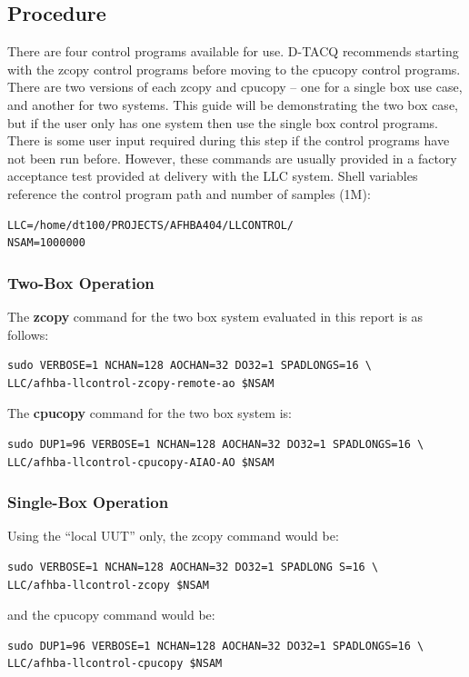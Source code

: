 \documentclass{article}
\begin{document}
\subsection{Procedure}
There are four control programs available for use.
\mbox{D-TACQ} recommends starting with the zcopy control programs before moving to the cpucopy control programs.
There are two versions of each zcopy and cpucopy – one for a single box use case, and another for two systems.
This guide will be demonstrating the two box case, but if the user only has one system then use the single box control programs.
There is some user input required during this step if the control programs have not been run before.
However, these commands are usually provided in a factory acceptance test provided at delivery with the LLC system.
Shell variables reference the control program path and number of samples (1M):
\begin{verbatim}
LLC=/home/dt100/PROJECTS/AFHBA404/LLCONTROL/
NSAM=1000000
\end{verbatim}

\subsubsection{Two-Box Operation}
The \textbf{zcopy} command for the two box system evaluated in this report is as follows:

\begin{verbatim}
sudo VERBOSE=1 NCHAN=128 AOCHAN=32 DO32=1 SPADLONGS=16 \
LLC/afhba-llcontrol-zcopy-remote-ao $NSAM
\end{verbatim}

The \textbf{cpucopy} command for the two box system is:
\begin{verbatim}
sudo DUP1=96 VERBOSE=1 NCHAN=128 AOCHAN=32 DO32=1 SPADLONGS=16 \
LLC/afhba-llcontrol-cpucopy-AIAO-AO $NSAM
\end{verbatim}

\subsubsection{Single-Box Operation}

Using the “local UUT” only, the zcopy command would be:
\begin{verbatim}
sudo VERBOSE=1 NCHAN=128 AOCHAN=32 DO32=1 SPADLONG S=16 \
LLC/afhba-llcontrol-zcopy $NSAM
\end{verbatim}

and the cpucopy command would be:

\begin{verbatim}
sudo DUP1=96 VERBOSE=1 NCHAN=128 AOCHAN=32 DO32=1 SPADLONGS=16 \
LLC/afhba-llcontrol-cpucopy $NSAM
\end{verbatim}
\end{document}
